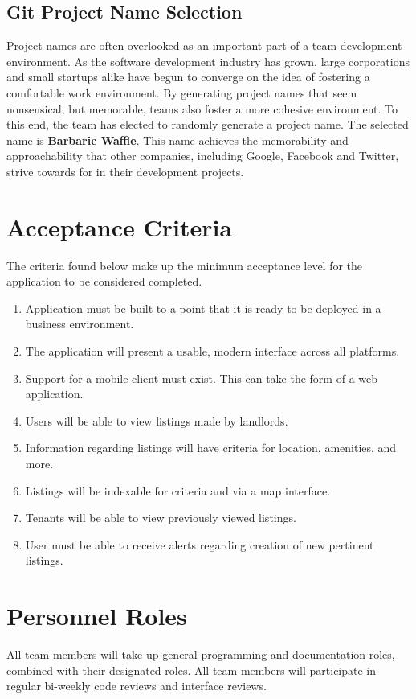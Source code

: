 \documentclass[14pt]{article}
\begin{document}
\subsection{Git Project Name Selection}
Project names are often overlooked as an important part of a team development environment. As the software development industry has grown, large corporations and small startups alike have begun to converge on the idea of fostering a comfortable work environment. By generating project names that seem nonsensical, but memorable, teams also foster a more cohesive environment. To this end, the team has elected to randomly generate a project name. The selected name is \textbf{Barbaric Waffle}. This name achieves the memorability and approachability that other companies, including Google, Facebook and Twitter, strive towards for in their development projects.

\section{Acceptance Criteria}
The criteria found below make up the minimum acceptance level for the application to be considered completed.
\begin{enumerate}
	\item Application must be built to a point that it is ready to be deployed in a business environment.
	\item The application will present a usable, modern interface across all platforms.
	\item Support for a mobile client must exist. This can take the form of a web application.
	\item Users will be able to view listings made by landlords.
	\item Information regarding listings will have criteria for location, amenities, and more.
	\item Listings will be indexable for criteria and via a map interface.
	\item Tenants will be able to view previously viewed listings.
	\item User must be able to receive alerts regarding creation of new pertinent listings.
\end{enumerate}

\section{Personnel Roles}
All team members will take up general programming and documentation roles, combined with their designated roles. All team members will participate in regular bi-weekly code reviews and interface reviews.
\end{document}
